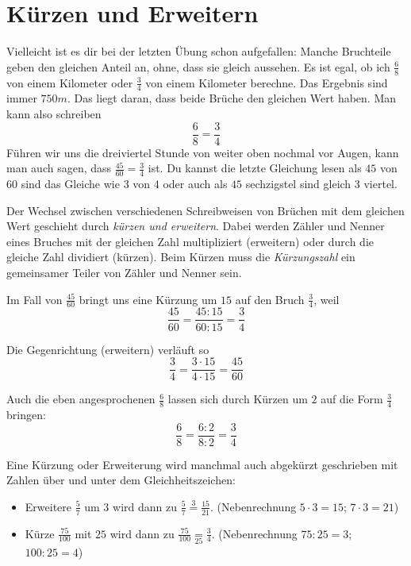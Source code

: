 \section{Kürzen und Erweitern}\vspace{-1em}
Vielleicht ist es dir bei der letzten Übung schon aufgefallen: Manche Bruchteile geben den gleichen Anteil an, ohne, dass sie gleich aussehen. Es ist egal, ob ich $\frac{6}{8}$ von einem Kilometer oder $\frac{3}{4}$ von einem Kilometer berechne. Das Ergebnis sind immer $750m$. Das liegt daran, dass beide Brüche den gleichen Wert haben. Man kann also schreiben
\begin{equation*}
	\frac{6}{8}=\frac{3}{4}
\end{equation*}
Führen wir uns die dreiviertel Stunde von weiter oben nochmal vor Augen, kann man auch sagen, dass $\frac{45}{60}=\frac{3}{4}$ ist. Du kannst die letzte Gleichung lesen als \glqq{}$45$ von $60$ sind das Gleiche wie $3$ von $4$\grqq{} oder auch als \glqq{}$45$ sechzigstel sind gleich $3$ viertel\grqq{}.

Der Wechsel zwischen verschiedenen Schreibweisen von Brüchen mit dem gleichen Wert geschieht durch \emph{kürzen und erweitern}. Dabei werden Zähler und Nenner eines Bruches mit der gleichen Zahl multipliziert (erweitern) oder durch die gleiche Zahl dividiert (kürzen). Beim Kürzen muss die \emph{Kürzungszahl} ein gemeinsamer Teiler von Zähler und Nenner sein.

Im Fall von $\frac{45}{60}$ bringt uns eine Kürzung um $15$ auf den Bruch $\frac{3}{4}$, weil 
\begin{equation*}
	\frac{45}{60}=\frac{45:15}{60:15}=\frac{3}{4}
\end{equation*}

Die Gegenrichtung (erweitern) verläuft so
\begin{equation*}
	\frac{3}{4}= \frac{3\cdot 15}{4\cdot 15}=\frac{45}{60}
\end{equation*}

Auch die eben angesprochenen $\frac{6}{8}$ lassen sich durch Kürzen um $2$ auf die Form $\frac{3}{4}$ bringen:
\begin{equation*}
	\frac{6}{8}=\frac{6:2}{8:2}=\frac{3}{4}
\end{equation*}

Eine Kürzung oder Erweiterung wird manchmal auch abgekürzt geschrieben mit Zahlen über und unter dem Gleichheitszeichen:
\begin{itemize}[]
	\item \glqq{}Erweitere $\frac{5}{7}$ um $3$\grqq{} wird dann zu $\frac{5}{7}\overset{3}{=}\frac{15}{21}$. \hfill (Nebenrechnung  $5\cdot3=15$;  $7\cdot 3 = 21$)
	\item \glqq{}Kürze $\frac{75}{100}$ mit $25$\grqq{} wird dann zu $\frac{75}{100} \underset{25}{=}\frac{3}{4}$. \hfill (Nebenrechnung $75:25=3$;  $100:25=4$)
\end{itemize}

